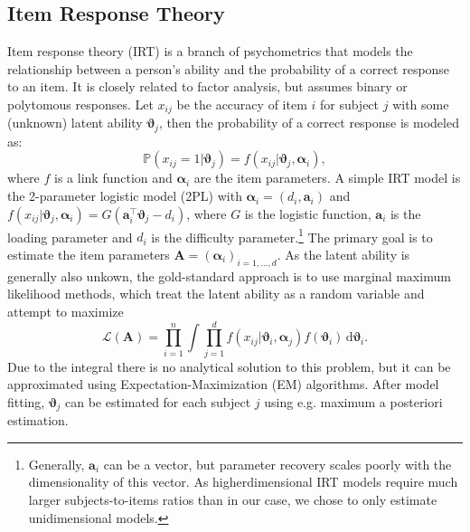 \documentclass{article}
\begin{document}
\subsection{Item Response Theory}
Item response theory (IRT) is a branch of psychometrics that models the relationship between a person's ability and the probability of a correct response to an item. It is closely related to factor analysis, but assumes binary or polytomous responses. %
Let $x_{ij}$ be the accuracy of item $i$ for subject $j$ with some (unknown) latent ability $\boldsymbol \vartheta_j$, then the probability of a correct response is modeled as:
\begin{equation}
   \mathbb P(x_{ij}=1|\boldsymbol \vartheta_j) = f(x_{ij}|\boldsymbol \vartheta_j, \boldsymbol \alpha_i),
\end{equation}
where $f$ is a link function and $\boldsymbol \alpha_i$ are the item parameters. A simple IRT model is the 2-parameter logistic model (2PL) with $\boldsymbol \alpha_i = (d_i, \mathbf a_i)$ and $f(x_{ij}|\boldsymbol \vartheta_j, \boldsymbol \alpha_i) = G(\mathbf a_i^\top  \boldsymbol \vartheta_j - d_i)$, where $G$ is the logistic function, $\mathbf a_i$ is the loading parameter and $d_i$ is the difficulty parameter.\footnote{Generally, $\mathbf a_i$ can be a vector, but parameter recovery scales poorly with the dimensionality of this vector. As higherdimensional IRT models require much larger subjects-to-items ratios than in our case, we chose to only estimate unidimensional models.} The primary goal is to estimate the item parameters $\mathbf A = (\boldsymbol \alpha_i)_{i = 1, \ldots, d}$. As the latent ability is generally also unkown, the gold-standard approach is to use marginal maximum likelihood methods, which treat the latent ability as a random variable and attempt to maximize $$\mathcal L(\mathbf A) = \prod_{i=1}^n \int \prod_{j=1}^d f(x_{ij}|\boldsymbol \vartheta_i, \boldsymbol\alpha_j) f(\boldsymbol \vartheta_i) \, \mathrm d\boldsymbol \vartheta_i.$$ Due to the integral there is no analytical solution to this problem, but it can be approximated using Expectation-Maximization (EM) algorithms. %
After model fitting, $\boldsymbol \vartheta_j$ can be estimated for each subject $j$ using e.g. maximum a posteriori estimation. %
\end{document}
